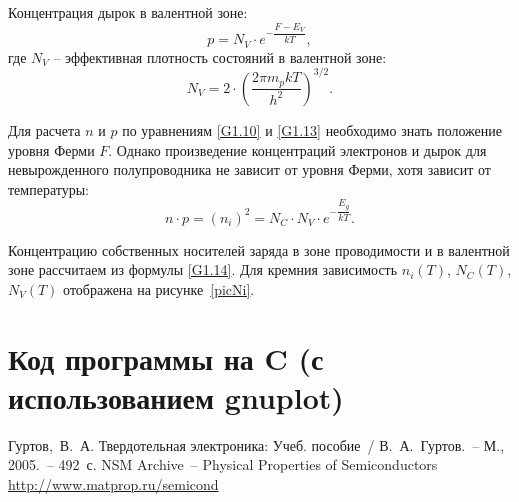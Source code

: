 \documentclass[14pt,a4paper]{extarticle}
\begin{document}
  Концентрация дырок в валентной зоне:
  \begin{equation}
    p = N_V\cdot e^{-\dfrac{F - E_V}{kT}},
    \label{G1.13}
  \end{equation}
  где \( N_V \) -- эффективная плотность состояний в валентной зоне:
  \[
    N_V = 2\cdot\left (\frac{2\pi m_p kT}{h^2} \right)^{3/2}.
  \]

  Для расчета \( n \) и \( p \) по уравнениям \eqref{G1.10} и \eqref{G1.13}
  необходимо знать положение уровня Ферми \( F \). Однако произведение
  концентраций электронов и дырок для невырожденного полупроводника не зависит
  от уровня Ферми, хотя зависит от температуры:
  \begin{equation}
    n\cdot p = (n_i)^2 = N_C\cdot N_V\cdot e^{-\dfrac{E_g}{kT}}.
    \label{G1.14}
  \end{equation}

  Концентрацию собственных носителей заряда в зоне проводимости и в валентной
  зоне рассчитаем из формулы \eqref{G1.14}. Для кремния зависимость
  \( n_i(T) \), \( N_C(T) \), \( N_V(T) \) отображена на рисунке~\ref{picNi}.

  \newpage

  \section[Код программы]{Код программы на C (с использованием gnuplot)}
  {\small
  
  }

  \newpage

  \begin{thebibliography}{9}
     Гуртов,~В.~А. Твердотельная электроника: Учеб. пособие~/
      В.~А.~Гуртов.~-- М., 2005.~-- 492~с.
     NSM Archive~-- Physical Properties of Semiconductors \\
      \url{http://www.matprop.ru/semicond}
  \end{thebibliography}
\end{document}
